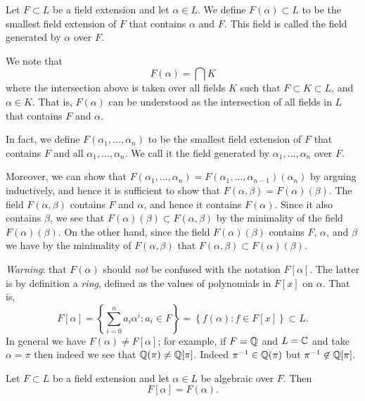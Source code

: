 

\begin{definition}
	Let $F \subset L$ be a field extension and let $\alpha \in L$. 
	We define $F(\alpha) \subset L$ to be the smallest field extension of $F$
	that contains $\alpha$ and $F$.
	This field is called the field generated by $\alpha$ over $F$.
\end{definition}

We note that
\[
	F(\alpha) = \bigcap K
\]
where the intersection above is taken over all fields $K$ such that
$F \subset K \subset L$, and $\alpha \in K$. That is, $F(\alpha)$ can be
understood as the intersection of all fields in $L$ that contains $F$
and $\alpha$.

In fact, we define $F(\alpha_1, \ldots, \alpha_n)$ to be the smallest field
extension of $F$ that contains $F$ and all $\alpha_1, \ldots, \alpha_n$.
We call it the field generated by $\alpha_1, \ldots, \alpha_n$ over $F$.

Moreover, we can show that 
$
	F(\alpha_1, \ldots, \alpha_n) 
		= F(\alpha_1, \ldots, \alpha_{n-1})(\alpha_n)
$
by arguing inductively, and hence it is sufficient to show that
$F(\alpha, \beta) = F(\alpha)(\beta)$.
The field $F(\alpha, \beta)$ contains $F$ and $\alpha$, and hence it 
contains
$F(\alpha)$. Since it also contains $\beta$, we see that
$F(\alpha)(\beta) \subset F(\alpha, \beta)$ by the minimality of the field
$F(\alpha)(\beta)$.
On the other hand, since the field $F(\alpha)(\beta)$ contains $F$, 
$\alpha$, and $\beta$ we have by the minimality of $F(\alpha, \beta)$ that
$F(\alpha, \beta) \subset F(\alpha)(\beta)$.

\emph{Warning}: that $F(\alpha)$ should \emph{not} be confused with the
notation $F[\alpha]$.
The latter is by definition a \emph{ring}, defined as the values of
polynomials in $F[x]$ on $\alpha$.
That is,
\[
	F[\alpha]
	= \left\{
		\sum_{i=0}^n a_i\alpha^i : a_i \in F
	\right\}
	= \left\{ 
		f(\alpha) : f \in F[x]
	\right\}
	\subset L.
\]
In general we have $F(\alpha) \neq F[\alpha]$; for example, if $F = \mathbb{Q}$ and
$L = \mathbb{C}$ and take $\alpha = \pi$ then indeed we see that
$\mathbb{Q}(\pi) \neq \mathbb{Q}[\pi]$.
Indeed $\pi^{-1} \in \mathbb{Q}(\pi)$ but $\pi^{-1} \not\in \mathbb{Q}[\pi]$.

\begin{lemma}[]
	Let $F \subset L$ be a field extension and let $\alpha \in L$ be algebraic
	over $F$. Then
	\[
		F[\alpha] = F(\alpha).
	\]
\end{lemma}

